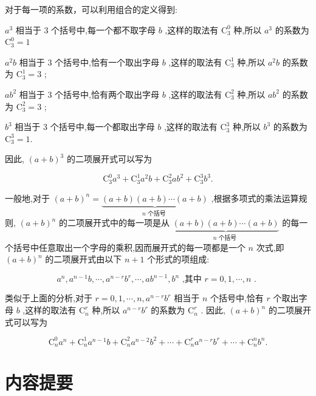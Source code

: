 \documentclass[10pt]{article}
\begin{document}
对于每一项的系数，可以利用组合的定义得到:

\({a}^{3}\) 相当于 3 个括号中,每一个都不取字母 \(b\) ,这样的取法有 \({\mathrm{C}}_{3}^{0}\) 种,所以 \({a}^{3}\) 的系数为 \({\mathrm{C}}_{3}^{0} = 1\)

\({a}^{2}b\) 相当于 3 个括号中,恰有一个取出字母 \(b\) ,这样的取法有 \({\mathrm{C}}_{3}^{1}\) 种,所以 \({a}^{2}b\) 的系数为 \({\mathrm{C}}_{3}^{1} = 3\) ;

\(a{b}^{2}\) 相当于 3 个括号中,恰有两个取出字母 \(b\) ,这样的取法有 \({\mathrm{C}}_{3}^{2}\) 种,所以 \(a{b}^{2}\) 的系数为 \({\mathrm{C}}_{3}^{2} = 3\) ;

\({b}^{3}\) 相当于 3 个括号中,每一个都取出字母 \(b\) ,这样的取法有 \({\mathrm{C}}_{3}^{3}\) 种,所以 \({b}^{3}\) 的系数为 \({\mathrm{C}}_{3}^{3} = 1.\)

因此, \({\left( a + b\right) }^{3}\) 的二项展开式可以写为

\[
{\mathrm{C}}_{3}^{0}{a}^{3} + {\mathrm{C}}_{3}^{1}{a}^{2}b + {\mathrm{C}}_{3}^{2}a{b}^{2} + {\mathrm{C}}_{3}^{3}{b}^{3}.
\]

一般地,对于 \({\left( a + b\right) }^{n} = \underset{n\text{ 个括号 }}{\underbrace{\left( {a + b}\right) \left( {a + b}\right) \cdots \left( {a + b}\right) }}\) ,根据多项式的乘法运算规则, \({\left( a + b\right) }^{n}\) 的二项展开式中的每一项是从 \(\underset{n\text{ 个括号 }}{\underbrace{\left( {a + b}\right) \left( {a + b}\right) \cdots \left( {a + b}\right) }}\) 的每一个括号中任意取出一个字母的乘积,因而展开式的每一项都是一个 \(n\) 次式,即 \({\left( a + b\right) }^{n}\) 的二项展开式由以下 \(n + 1\) 个形式的项组成:

\[
{a}^{n},{a}^{n - 1}b,\cdots ,{a}^{n - r}{b}^{r},\cdots ,a{b}^{n - 1},{b}^{n}\text{ ,其中 }r = 0,1,\cdots ,n\text{ . }
\]

类似于上面的分析,对于 \(r = 0,1,\cdots ,n,{a}^{n - r}{b}^{r}\) 相当于 \(n\) 个括号中,恰有 \(r\) 个取出字母 \(b\) ,这样的取法有 \({\mathrm{C}}_{n}^{r}\) 种,所以 \({a}^{n - r}{b}^{r}\) 的系数为 \({\mathrm{C}}_{n}^{r}\) . 因此, \({\left( a + b\right) }^{n}\) 的二项展开式可以写为

\[
{\mathrm{C}}_{n}^{0}{a}^{n} + {\mathrm{C}}_{n}^{1}{a}^{n - 1}b + {\mathrm{C}}_{n}^{2}{a}^{n - 2}{b}^{2} + \cdots  + {\mathrm{C}}_{n}^{r}{a}^{n - r}{b}^{r} + \cdots  + {\mathrm{C}}_{n}^{n}{b}^{n}.
\]



\section*{内容提要}
\end{document}
